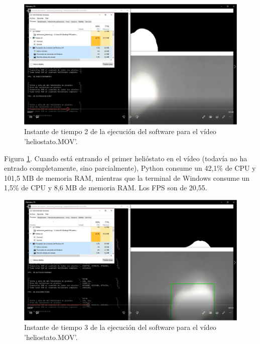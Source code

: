 \begin{figure}[h!]
  	\centering
	\includegraphics[width=\textwidth]{CapturasRendimientoSoftware2/Imagen2.png}
	\caption{Instante de tiempo 2 de la ejecución del software para el vídeo 'heliostato.MOV'.
	\label{fig:CapturasRendimientoSoftware2/Imagen2.png}}
\end{figure}

Figura \ref{fig:CapturasRendimientoSoftware2/Imagen2.png}. Cuando está entrando el primer helióstato en el vídeo (todavía no ha entrado completamente, sino parcialmente), Python consume un 42,1\% de CPU y 101,5 MB de memoria RAM, mientras que la terminal de Windows consume un 1,5\% de CPU y 8,6 MB de memoria RAM. Los FPS son de 20,55.\\[20pt]

\begin{figure}[h!]
  	\centering
	\includegraphics[width=\textwidth]{CapturasRendimientoSoftware2/Imagen3.png}
	\caption{Instante de tiempo 3 de la ejecución del software para el vídeo 'heliostato.MOV'.
	\label{fig:CapturasRendimientoSoftware2/Imagen3.png}}
\end{figure}

